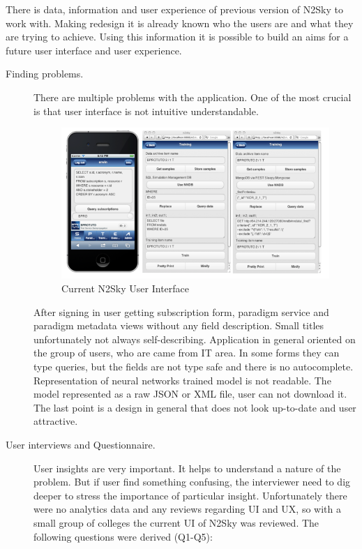 There is data, information and user experience of previous version of N2Sky to work with. Making redesign it is already known who the users are and what they are trying to achieve.  Using this information it is possible to build an aims for a future user interface and user experience.


\begin{description}

\item[Finding problems.]  There are multiple problems with the application. One of the most crucial is that user interface is not intuitive understandable. 
\begin{figure}[htbp]
\begin{center}
  \includegraphics[width=\linewidth]{components/2/old_arch.png}
  \caption{Current N2Sky User Interface}
  \label{fig:old_arch}
\end{center}
\end{figure}


After signing in user getting subscription form, paradigm service and paradigm metadata views without any field description. Small titles unfortunately not always self-describing. Application in general oriented on the group of users, who are came from IT area. In some forms they can type queries, but the fields are not type safe and there is no autocomplete.
Representation of neural networks trained model is not readable. The model represented as a raw JSON or XML file, user can not download it. The last point is a design in general that does not look up-to-date and user attractive. 


\item[User interviews and Questionnaire.]
User insights are very important. It helps to understand a nature of the problem. But if user find something confusing, the interviewer need to dig deeper to stress the importance of particular insight. Unfortunately there were no analytics data and any reviews regarding UI and UX, so with a small group of colleges the current UI of N2Sky was reviewed. 
The following questions were derived (Q1-Q5): 



\end{description}
